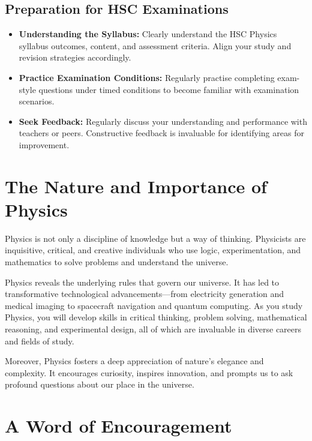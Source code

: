 \subsection{Preparation for HSC Examinations}
\FloatBarrier

\begin{itemize}
\item \textbf{Understanding the Syllabus:} Clearly understand the HSC Physics syllabus outcomes, content, and assessment criteria. Align your study and revision strategies accordingly.
\item \textbf{Practice Examination Conditions:} Regularly practise completing exam-style questions under timed conditions to become familiar with examination scenarios.
\item \textbf{Seek Feedback:} Regularly discuss your understanding and performance with teachers or peers. Constructive feedback is invaluable for identifying areas for improvement.
\end{itemize}

\section{The Nature and Importance of Physics}
\FloatBarrier

Physics is not only a discipline of knowledge but a way of thinking. Physicists are inquisitive, critical, and creative individuals who use logic, experimentation, and mathematics to solve problems and understand the universe.

Physics reveals the underlying rules that govern our universe. It has led to transformative technological advancements—from electricity generation and medical imaging to spacecraft navigation and quantum computing. As you study Physics, you will develop skills in critical thinking, problem solving, mathematical reasoning, and experimental design, all of which are invaluable in diverse careers and fields of study.

Moreover, Physics fosters a deep appreciation of nature's elegance and complexity. It encourages curiosity, inspires innovation, and prompts us to ask profound questions about our place in the universe.

\section{A Word of Encouragement}
\FloatBarrier

